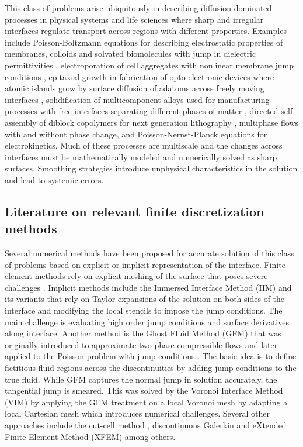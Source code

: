\documentclass{elsarticle}
\begin{document}
This class of problems arise ubiquitously in describing diffusion dominated processes in physical systems and life sciences where sharp and irregular interfaces regulate transport across regions with different properties. Examples include Poisson-Boltzmann equations for describing electrostatic properties of membranes, colloids and solvated biomolecules with jump in dielectric permittivities \cite{sharp1990calculating,MirzadehPB}, electroporation of cell aggregates with nonlinear membrane jump conditions \cite{mistani2019parallel}, epitaxial growth in fabrication of opto-electronic devices where atomic islands grow by surface diffusion of adatoms across freely moving interfaces \cite{MISTANI2018150}, solidification of multicomponent alloys used for manufacturing processes with free interfaces separating different phases of matter \citep{theillard2015sharp,bochkov2021sharp}, directed self-assembly of diblock copolymers for next generation lithography \cite{galatsis2010patterning,ouaknin2018level,bochkov2021non}, multiphase flows with and without phase change, and Poisson-Nernst-Planck equations for electrokinetics. Much of these processes are multiscale and the changes across interfaces must be mathematically modeled and numerically solved as sharp surfaces. Smoothing strategies introduce unphysical characteristics in the solution and lead to systemic errors.

\subsection{Literature on relevant finite discretization methods}
Several numerical methods have been proposed for accurate solution of this class of problems based on explicit or implicit representation of the interface. Finite element methods rely on explicit meshing of the surface that poses severe challenges \cite{babuvska1970finite,bramble1996finite}. Implicit methods include the Immersed Interface Method (IIM) \cite{leveque1994immersed} and its variants \cite{adams2002immersed,li2003new,ewing1999immersed,gong2008immersed} that rely on Taylor expansions of the solution on both sides of the interface and modifying the local stencils to impose the jump conditions. The main challenge is evaluating high order jump conditions and surface derivatives along interface. Another method is the Ghost Fluid Method (GFM) \cite{fedkiw1999non} that was originally introduced to approximate two-phase compressible flows and later applied to the Poisson problem with jump conditions \cite{liu2000boundary}. The basic idea is to define fictitious fluid regions across the discontinuities by adding jump conditions to the true fluid. While GFM captures the normal jump in solution accurately, the tangential jump is smeared. This was solved by the Voronoi Interface Method (VIM) \cite{guittet2015solving} by applying the GFM treatment on a local Voronoi mesh by adapting a local Cartesian mesh which introduces numerical challenges. Several other approaches include the cut-cell method \cite{crockett2011cartesian}, discontinuous Galerkin and eXtended Finite Element Method (XFEM) \cite{lew2008discontinuous,moes1999finite,belytschko2001arbitrary} among others.
\end{document}
